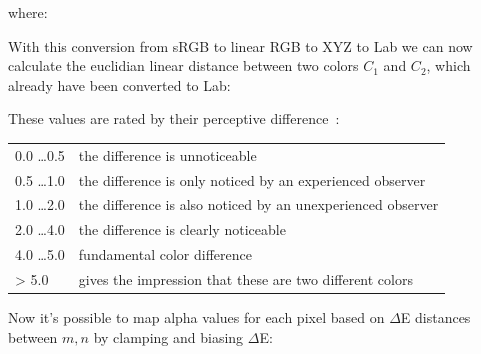 

where:





With this conversion from sRGB to linear RGB to XYZ to Lab we can now calculate 
the euclidian linear distance between two colors $C_1$ and $C_2$, which already 
have been converted to Lab:


These values are rated by their perceptive difference \cite{mokrzycki:2012}:

\begin{tabular}{l | l}
	0.0 \dots 0.5 & the difference is unnoticeable \\
	0.5 \dots 1.0 & the difference is only noticed by an experienced observer \\
	1.0 \dots 2.0 & the difference is also noticed by an unexperienced observer 
	\\
	2.0 \dots 4.0 & the difference is clearly noticeable \\
	4.0 \dots 5.0 & fundamental color difference  \\
	> 5.0 		  & gives the impression that these are two different 
	colors        
\end{tabular}

Now it's possible to map alpha values for each pixel based on $\Delta$E 
distances between $m, n$ by clamping and biasing $\Delta$E:

